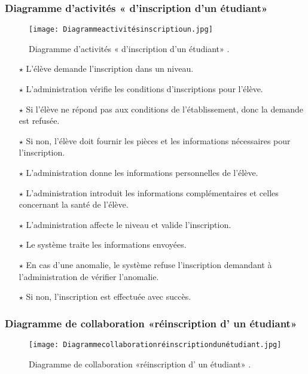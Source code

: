 \subsubsection{Diagramme d'activités « d'inscription d'un étudiant» }
\begin{figure}[ht]
	\centering
	\texttt{[image: Diagrammeactivitésinscriptioun.jpg]}
	\caption{Diagramme d'activités « d'inscription d'un étudiant» .}
	\label{fig:Diagramme d' activités  d' inscription d'un étudiant   }
\end{figure}
\FloatBarrier

\begin{itemize}	
\item[$\star$]L’élève demande l’inscription dans un niveau.
\item[$\star$] L’administration vérifie les conditions d’inscriptions pour l’élève.
\item[$\star$] Si l’élève ne répond pas aux conditions de l’établissement, donc la demande est refusée.
\item[$\star$] Si non, l’élève doit fournir les pièces et les informations nécessaires pour
l’inscription.
\item[$\star$] L’administration donne les informations personnelles de l’élève.
\item[$\star$] L’administration introduit les informations complémentaires et celles concernant la santé de l’élève.
\item[$\star$] L’administration affecte le niveau et valide l’inscription.
\item[$\star$] Le système traite les informations envoyées.
\item[$\star$] En cas d’une anomalie, le système refuse l’inscription demandant à l’administration de vérifier l’anomalie.
\item[$\star$] Si non, l’inscription est effectuée avec succès.
\end{itemize}	
\subsubsection{Diagramme de collaboration «réinscription d' un étudiant»}
\begin{figure}[ht]
	\centering
	\texttt{[image: Diagrammecollaborationréinscriptiondunétudiant.jpg]}
	\caption{Diagramme de collaboration «réinscription d' un étudiant» .}
	\label{fig:Diagramme de collaboration réinscription d' un étudiant  }
\end{figure}
\FloatBarrier


